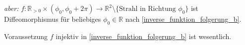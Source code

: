 \begin{example}
\begin{underlinedenvironment}[beachte]
		\emph{aber:} $f:\mathbb{R}_{>0}\times(\phi_0, \phi_0+2\pi)\to\mathbb{R}^2\setminus \{\text{Strahl in Richtung $\phi_0$}\}$ ist Diffeomorphismus für beliebiges $\phi_0\in \mathbb{R}$ nach  \ref{inverse_funktion_folgerung_b}.
	\end{underlinedenvironment}

	\begin{boldenvironment}[folglich]
		Voraussetzung $f$ injektiv in  \ref{inverse_funktion_folgerung_b} ist wesentlich.
	\end{boldenvironment}
\end{example}